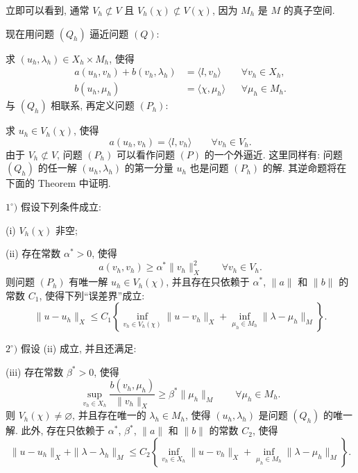 立即可以看到, 通常 $V_h\not\subset V$ 且
$V_h(\chi)\not\subset V(\chi)$, 因为 $M_h$ 是 $M$ 的真子空间.

现在用问题 $(Q_h)$ 逼近问题 $(Q)$:

求 $(u_h,\lambda_h)\in X_h\times M_h$, 使得
\begin{align}
a(u_h,v_h)+b(v_h,\lambda_h)&=\langle l,v_h\rangle
&&\forall v_h\in X_h,\label{eq:primitive-discrete-q-first}\\
b(u_h,\mu_h)&=\langle\chi,\mu_h\rangle
&&\forall\mu_h\in M_h.\label{eq:primitive-discrete-q-second}
\end{align}
与 $(Q_h)$ 相联系, 再定义问题 $(P_h)$:

求 $u_h\in V_h(\chi)$, 使得
\begin{equation}\label{eq:primitive-discrete-p}
a(u_h,v_h)=\langle l,v_h\rangle
\qquad\forall v_h\in V_h.
\end{equation}
由于 $V_h\not\subset V$, 问题 $(P_h)$ 可以看作问题 $(P)$ 的一个外逼近.
这里同样有: 问题 $(Q_h)$ 的任一解 $(u_h,\lambda_h)$ 的第一分量 $u_h$
也是问题 $(P_h)$ 的解. 其逆命题将在下面的 Theorem 中证明.

\setcounter{statement}{0}
\begin{Theorem}\label{thm:primitive-abstract-discrete-error}
$1^\circ)$ 假设下列条件成立:

(i) $V_h(\chi)$ 非空;

(ii) 存在常数 $\alpha^*>0$, 使得
\begin{equation}\label{eq:primitive-discrete-ellipticity}
a(v_h,v_h)\geq\alpha^*\|v_h\|_X^2
\qquad\forall v_h\in V_h.
\end{equation}
则问题 $(P_h)$ 有唯一解 $u_h\in V_h(\chi)$, 并且存在只依赖于
$\alpha^*$, $\|a\|$ 和 $\|b\|$ 的常数 $C_1$, 使得下列``误差界''成立:
\begin{equation}\label{eq:primitive-discrete-velocity-error}
\|u-u_h\|_X
\leq C_1\left\{
\inf_{v_h\in V_h(\chi)}\|u-v_h\|_X
+\inf_{\mu_h\in M_h}\|\lambda-\mu_h\|_M
\right\}.
\end{equation}

$2^\circ)$ 假设 (ii) 成立, 并且还满足:

(iii) 存在常数 $\beta^*>0$, 使得
\begin{equation}\label{eq:primitive-discrete-inf-sup}
\sup_{v_h\in X_h}\frac{b(v_h,\mu_h)}{\|v_h\|_X}
\geq\beta^*\|\mu_h\|_M
\qquad\forall\mu_h\in M_h.
\end{equation}
则 $V_h(\chi)\neq\varnothing$, 并且存在唯一的 $\lambda_h\in M_h$,
使得 $(u_h,\lambda_h)$ 是问题 $(Q_h)$ 的唯一解. 此外, 存在只依赖于
$\alpha^*$, $\beta^*$, $\|a\|$ 和 $\|b\|$ 的常数 $C_2$, 使得
\begin{equation}\label{eq:primitive-discrete-total-error}
\|u-u_h\|_X+\|\lambda-\lambda_h\|_M
\leq C_2\left\{
\inf_{v_h\in X_h}\|u-v_h\|_X
+\inf_{\mu_h\in M_h}\|\lambda-\mu_h\|_M
\right\}.
\end{equation}
\end{Theorem}

